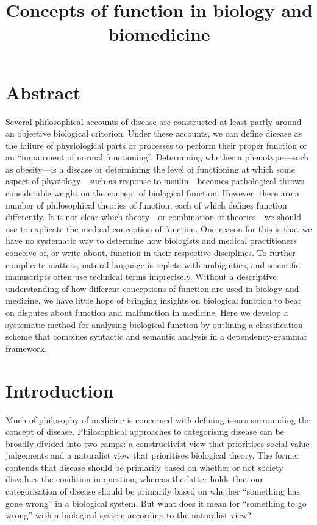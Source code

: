 \documentclass{article}
\title{Concepts of function in biology and biomedicine}
\begin{document}
\maketitle

\section{Abstract}
\label{sec:abstract}

Several philosophical accounts of disease are constructed at least partly around an objective biological criterion. Under these accounts, we can define disease as the failure of physiological parts or processes to perform their proper function or an ``impairment of normal functioning''. Determining whether a phenotype—such as obesity—is a disease or determining the level of functioning at which some aspect of physiology—such as response to insulin—becomes pathological throws considerable weight on the concept of biological function. However, there are a number of philosophical theories of function, each of which defines function differently. It is not clear which theory—or combination of theories—we should use to explicate the medical conception of function. One reason for this is that we have no systematic way to determine how biologists and medical practitioners conceive of, or write about, function in their respective disciplines. To further complicate matters, natural language is replete with ambiguities, and scientific manuscripts often use technical terms imprecisely. Without a descriptive understanding of how different conceptions of function are used in biology and medicine, we have little hope of bringing insights on biological function to bear on disputes about function and malfunction in medicine. Here we develop a systematic method for analysing biological function by outlining a classification scheme that combines syntactic and semantic analysis in a dependency-grammar framework.


\section{Introduction}
\label{sec:introduction}

Much of philosophy of medicine is concerned with defining issues surrounding the concept of disease.
Philosophical approaches to categorising disease can be broadly divided into two camps: a constructivist view that prioritises social value judgements and a naturalist view that prioritises biological theory.
The former contends that disease should be primarily based on whether or not society disvalues the condition in question, whereas the latter holds that our categorisation of disease should be primarily based on whether ``something has gone wrong'' in a biological system.
But what does it mean for ``something to go wrong'' with a biological system according to the naturalist view?
\end{document}
